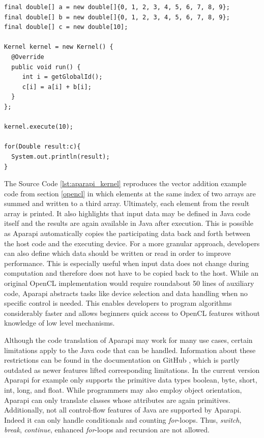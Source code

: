 \begin{minipage}{\linewidth}
\begin{lstlisting}[caption=Aparapi Vector Addition Kernel,captionpos=b,label=lst:aparapi_kernel]
final double[] a = new double[]{0, 1, 2, 3, 4, 5, 6, 7, 8, 9};
final double[] b = new double[]{0, 1, 2, 3, 4, 5, 6, 7, 8, 9};
final double[] c = new double[10];

Kernel kernel = new Kernel() {
  @Override
  public void run() {
     int i = getGlobalId();
     c[i] = a[i] + b[i];
  }
};

kernel.execute(10);

for(Double result:c){
  System.out.println(result);
}
\end{lstlisting}
\end{minipage}
The Source Code \ref{lst:aparapi_kernel} reproduces the vector addition example code from section \ref{opencl} in which elements at the same index of two arrays are summed and written to a third array. Ultimately, each element from the result array is printed. It also highlights that input data may be defined in Java code itself and the results are again available in Java after execution. This is possible as Aparapi automatically copies the participating data back and forth between the host code and the executing device. For a more granular approach, developers can also define which data should be written or read in order to improve performance. This is especially useful when input data does not change during computation and therefore does not have to be copied back to the host. While an original OpenCL implementation would require roundabout 50 lines of auxiliary code, Aparapi abstracts tasks like device selection and data handling when no specific control is needed. This enables developers to program algorithms considerably faster and allows beginners quick access to OpenCL features without knowledge of low level mechanisms.

Although the code translation of Aparapi may work for many use cases, certain limitations apply to the Java code that can be handled. Information about these restrictions can be found in the documentation on GitHub \cite{aparapi_kernel_guidelines}, which is partly outdated as newer features lifted corresponding limitations. In the current version Aparapi for example only supports the primitive data types boolean, byte, short, int, long, and float. While programmers may also employ object orientation, Aparapi can only translate classes whose attributes are again primitives. Additionally, not all control-flow features of Java are supported by Aparapi. Indeed it can only handle conditionals and counting \textit{for}-loops. Thus, \textit{switch}, \textit{break}, \textit{continue}, enhanced \textit{for}-loops and recursion are not allowed.

